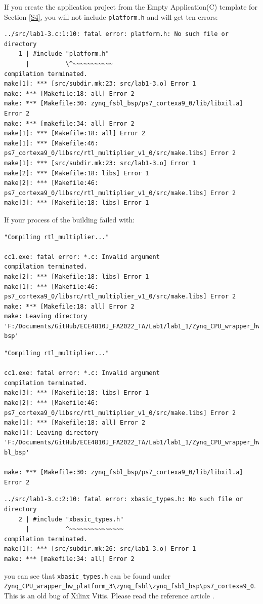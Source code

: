 \documentclass[a4paper,12pt,twoside]{article}
\begin{document}
If you create the application project from the Empty Application(C) template for Section \ref{S4}, you will not include \texttt{platform.h} and will get ten errors:
\begin{verbatim}
../src/lab1-3.c:1:10: fatal error: platform.h: No such file or directory
    1 | #include "platform.h"
      |          \^~~~~~~~~~~~
compilation terminated.
make[1]: *** [src/subdir.mk:23: src/lab1-3.o] Error 1
make: *** [Makefile:18: all] Error 2
make: *** [Makefile:30: zynq_fsbl_bsp/ps7_cortexa9_0/lib/libxil.a] Error 2
make: *** [makefile:34: all] Error 2
make[1]: *** [Makefile:18: all] Error 2
make[1]: *** [Makefile:46: ps7_cortexa9_0/libsrc/rtl_multiplier_v1_0/src/make.libs] Error 2
make[1]: *** [src/subdir.mk:23: src/lab1-3.o] Error 1
make[2]: *** [Makefile:18: libs] Error 1
make[2]: *** [Makefile:46: ps7_cortexa9_0/libsrc/rtl_multiplier_v1_0/src/make.libs] Error 2
make[3]: *** [Makefile:18: libs] Error 1
\end{verbatim}
If your process of the building failed with:
\begin{verbatim}
"Compiling rtl_multiplier..."

cc1.exe: fatal error: *.c: Invalid argument
compilation terminated.
make[2]: *** [Makefile:18: libs] Error 1
make[1]: *** [Makefile:46: ps7_cortexa9_0/libsrc/rtl_multiplier_v1_0/src/make.libs] Error 2
make: *** [Makefile:18: all] Error 2
make: Leaving directory 'F:/Documents/GitHub/ECE4810J_FA2022_TA/Lab1/lab1_1/Zynq_CPU_wrapper_hw_platform_3/zynq_fsbl/zynq_fsbl_
bsp'
\end{verbatim}
\begin{verbatim}
"Compiling rtl_multiplier..."

cc1.exe: fatal error: *.c: Invalid argument
compilation terminated.
make[3]: *** [Makefile:18: libs] Error 1
make[2]: *** [Makefile:46: ps7_cortexa9_0/libsrc/rtl_multiplier_v1_0/src/make.libs] Error 2
make[1]: *** [Makefile:18: all] Error 2
make[1]: Leaving directory 'F:/Documents/GitHub/ECE4810J_FA2022_TA/Lab1/lab1_1/Zynq_CPU_wrapper_hw_platform_3/zynq_fsbl/zynq_fs
bl_bsp'

make: *** [Makefile:30: zynq_fsbl_bsp/ps7_cortexa9_0/lib/libxil.a] Error 2
\end{verbatim}
\begin{verbatim}
../src/lab1-3.c:2:10: fatal error: xbasic_types.h: No such file or directory
    2 | #include "xbasic_types.h"
      |          ^~~~~~~~~~~~~~~~
compilation terminated.
make[1]: *** [src/subdir.mk:26: src/lab1-3.o] Error 1
make: *** [makefile:34: all] Error 2
\end{verbatim}
you can see that \texttt{xbasic\_types.h} can be found under\\
\verb|Zynq_CPU_wrapper_hw_platform_3\zynq_fsbl\zynq_fsbl_bsp\ps7_cortexa9_0|. This is an old bug of Xilinx Vitis. Please read the reference article \cite{vitisgcc}.
\end{document}
